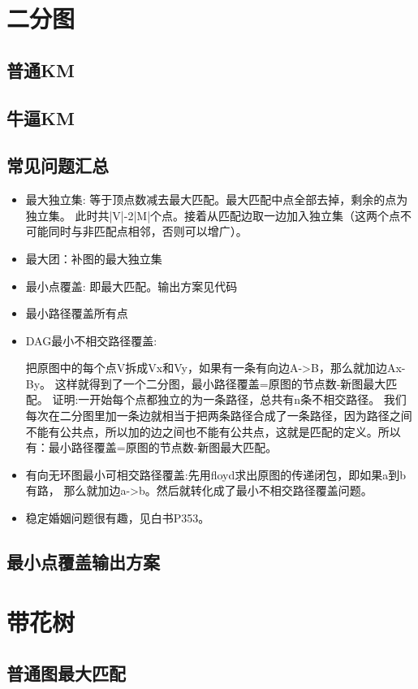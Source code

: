 \documentclass[landscape]{report}
\newcommand{\includecode}[2][c]{}
\begin{document}
\begin{flushleft}
\begin{multicols}{2}
\section{二分图}
\subsection{ 普通KM}
\includecode[c++]{uva11383.cpp}
\subsection{ 牛逼KM}
\includecode[c++]{poj3565Better.cpp}
\subsection{ 常见问题汇总}
\begin{itemize}
\item 最大独立集: 等于顶点数减去最大匹配。最大匹配中点全部去掉，剩余的点为独立集。 此时共|V|-2|M|个点。接着从匹配边取一边加入独立集（这两个点不可能同时与非匹配点相邻，否则可以增广）。
\item 最大团：补图的最大独立集
\item 最小点覆盖: 即最大匹配。输出方案见代码
\item 最小路径覆盖所有点
\item DAG最小不相交路径覆盖:

把原图中的每个点V拆成Vx和Vy，如果有一条有向边A->B，那么就加边Ax-By。 这样就得到了一个二分图，最小路径覆盖=原图的节点数-新图最大匹配。
证明:一开始每个点都独立的为一条路径，总共有n条不相交路径。
我们每次在二分图里加一条边就相当于把两条路径合成了一条路径，因为路径之间不能有公共点，所以加的边之间也不能有公共点，这就是匹配的定义。所以有：最小路径覆盖=原图的节点数-新图最大匹配。

\item 有向无环图最小可相交路径覆盖:先用floyd求出原图的传递闭包，即如果a到b有路， 那么就加边a->b。然后就转化成了最小不相交路径覆盖问题。
\item  稳定婚姻问题很有趣，见白书P353。
\end{itemize}
\subsection{ 最小点覆盖输出方案}
\includecode[c++]{uva11419.cpp}
\section{ 带花树}
\subsection{ 普通图最大匹配 }
\includecode[c++]{ural1099.cpp}

\end{multicols}
\end{flushleft}
\end{document}
